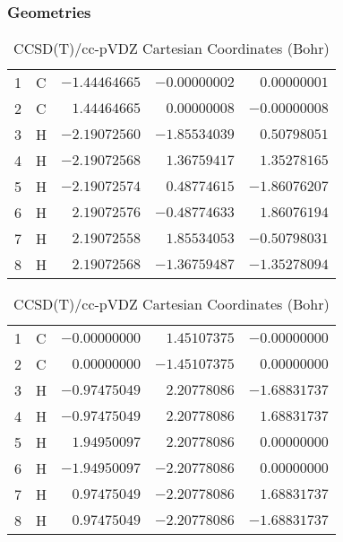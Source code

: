 \documentclass[10pt,oneside]{article}
\begin{document}
\clearpage

\subsection{}

\begin{table}[h!]
\subsubsection*{Geometries}
\begin{multicols}{2}
\centering
\caption{CCSD(T)/cc-pVTZ Cartesian Coordinates (Bohr)}
\begin{tabular}{llrrr}
\toprule
1  & C  & $-1.44464665$ & $-0.00000002$ & $ 0.00000001$ \\
2  & C  & $ 1.44464665$ & $ 0.00000008$ & $-0.00000008$ \\
3  & H  & $-2.19072560$ & $-1.85534039$ & $ 0.50798051$ \\
4  & H  & $-2.19072568$ & $ 1.36759417$ & $ 1.35278165$ \\
5  & H  & $-2.19072574$ & $ 0.48774615$ & $-1.86076207$ \\
6  & H  & $ 2.19072576$ & $-0.48774633$ & $ 1.86076194$ \\
7  & H  & $ 2.19072558$ & $ 1.85534053$ & $-0.50798031$ \\
8  & H  & $ 2.19072568$ & $-1.36759487$ & $-1.35278094$ \\
\bottomrule
\end{tabular}
\caption{CCSD(T)/cc-pVDZ Cartesian Coordinates (Bohr)}
\begin{tabular}{llrrr}
\toprule
1  & C  & $-0.00000000$ & $ 1.45107375$ & $-0.00000000$ \\
2  & C  & $ 0.00000000$ & $-1.45107375$ & $ 0.00000000$ \\
3  & H  & $-0.97475049$ & $ 2.20778086$ & $-1.68831737$ \\
4  & H  & $-0.97475049$ & $ 2.20778086$ & $ 1.68831737$ \\
5  & H  & $ 1.94950097$ & $ 2.20778086$ & $ 0.00000000$ \\
6  & H  & $-1.94950097$ & $-2.20778086$ & $ 0.00000000$ \\
7  & H  & $ 0.97475049$ & $-2.20778086$ & $ 1.68831737$ \\
8  & H  & $ 0.97475049$ & $-2.20778086$ & $-1.68831737$ \\
\bottomrule
\end{tabular}
\end{multicols}
\end{table}
\end{document}
